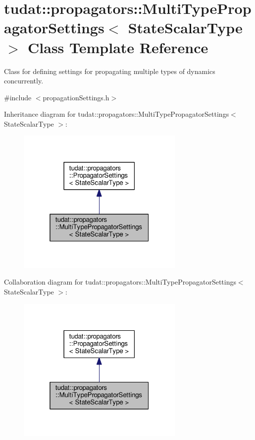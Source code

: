\hypertarget{classtudat_1_1propagators_1_1MultiTypePropagatorSettings}{}\section{tudat\+:\+:propagators\+:\+:Multi\+Type\+Propagator\+Settings$<$ State\+Scalar\+Type $>$ Class Template Reference}
\label{classtudat_1_1propagators_1_1MultiTypePropagatorSettings}


Class for defining settings for propagating multiple types of dynamics concurrently.  




{\ttfamily \#include $<$propagation\+Settings.\+h$>$}



Inheritance diagram for tudat\+:\+:propagators\+:\+:Multi\+Type\+Propagator\+Settings$<$ State\+Scalar\+Type $>$\+:
\nopagebreak
\begin{figure}[H]
\begin{center}
\leavevmode
\includegraphics[width=229pt]{classtudat_1_1propagators_1_1MultiTypePropagatorSettings__inherit__graph}
\end{center}
\end{figure}


Collaboration diagram for tudat\+:\+:propagators\+:\+:Multi\+Type\+Propagator\+Settings$<$ State\+Scalar\+Type $>$\+:
\nopagebreak
\begin{figure}[H]
\begin{center}
\leavevmode
\includegraphics[width=229pt]{classtudat_1_1propagators_1_1MultiTypePropagatorSettings__coll__graph}
\end{center}
\end{figure}
